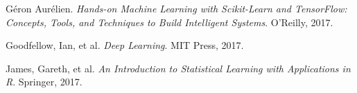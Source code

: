 \documentclass[12pt,letterpaper]{article}
\begin{document}

\begin{thebibliography}{9}


Géron Aurélien. \textit{Hands-on Machine Learning with Scikit-Learn and TensorFlow: Concepts, Tools, and Techniques to Build Intelligent Systems}. O'Reilly, 2017.

Goodfellow, Ian, et al. \textit{Deep Learning}. MIT Press, 2017.

James, Gareth, et al. \textit{An Introduction to Statistical Learning with Applications in R}. Springer, 2017.


\end{thebibliography}


\end{document}
